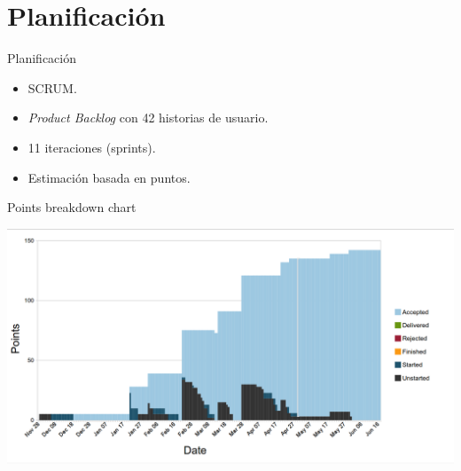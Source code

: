 \documentclass[10pt]{beamer}
\begin{document}
\section{Planificación}
\begin{frame}{Planificación}

\begin{itemize}
\item \alert{SCRUM}.
\item \textit{Product Backlog} con 42 \alert{historias de usuario}.
\item 11 iteraciones (\alert{sprints}).
\item Estimación basada en \alert{puntos}.
\end{itemize}

\begin{block}{Points breakdown chart}

\end{block}
{\centering \includegraphics[scale=0.18]{AAUgraphics/planificacion.png}\par}
\end{frame}
\end{document}
